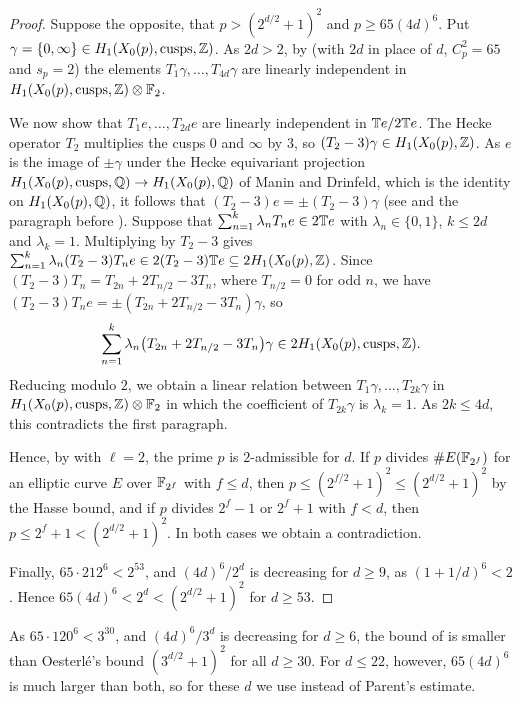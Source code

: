 \begin{proof}
Suppose the opposite, that $p>(2^{d/2}+1)^2$ and $p\geq65(4d)^6$. Put $\gamma=\{0,\infty\}\in H_1(X_0(p),\mathrm{cusps},\mathbb{Z})$. As $2d>2$, by \cite[Proposition 1.9]{parentformal} (with $2d$ in place of $d$, $C_p^2=65$ and $s_p=2$) the elements $T_1\gamma,\dots,T_{4d}\gamma$ are linearly independent in $H_1(X_0(p),\mathrm{cusps},\mathbb{Z})\otimes\mathbb{F}_2$.

We now show that $T_1e,\dots,T_{2d}e$ are linearly independent in $\mathbb{T} e/2\mathbb{T} e$. The Hecke operator $T_2$ multiplies the cusps $0$ and $\infty$ by $3$, so $(T_2-3)\gamma\in H_1(X_0(p),\mathbb{Z})$. As $e$ is the image of $\pm\gamma$ under the Hecke equivariant projection $H_1(X_0(p),\mathrm{cusps},\mathbb{Q})\to H_1(X_0(p),\mathbb{Q})$ of Manin and Drinfeld, which is the identity on $H_1(X_0(p),\mathbb{Q})$, it follows that $(T_2-3)e=\pm(T_2-3)\gamma$ (see \cite[Definition 2.1]{DKSS} and the paragraph before \cite[Corollary 6.4]{DKSS}). Suppose that $\sum_{n=1}^k\lambda_nT_ne\in2\mathbb{T} e$ with $\lambda_n\in\{0,1\}$, $k\leq2d$ and $\lambda_k=1$. Multiplying by $T_2-3$ gives $\sum_{n=1}^k\lambda_n(T_2-3)T_ne\in2(T_2-3)\mathbb{T} e\subseteq2H_1(X_0(p),\mathbb{Z})$. Since $(T_2-3)T_n=T_{2n}+2T_{n/2}-3T_n$, where $T_{n/2}=0$ for odd $n$, we have $(T_2-3)T_ne=\pm(T_{2n}+2T_{n/2}-3T_n)\gamma$, so
$$\sum_{n=1}^k\lambda_n\bigl(T_{2n}+2T_{n/2}-3T_n\bigr)\gamma\in2H_1(X_0(p),\mathrm{cusps},\mathbb{Z}).$$
Reducing modulo $2$, we obtain a linear relation between $T_1\gamma,\dots,T_{2k}\gamma$ in $H_1(X_0(p),\mathrm{cusps},\mathbb{Z})\otimes\mathbb{F}_2$ in which the coefficient of $T_{2k}\gamma$ is $\lambda_k=1$. As $2k\leq4d$, this contradicts the first paragraph.

Hence, by  with $\ell=2$, the prime $p$ is $2$-admissible for $d$. If $p$ divides $\#E(\mathbb{F}_{2^f})$ for an elliptic curve $E$ over $\mathbb{F}_{2^f}$ with $f\leq d$, then $p\leq(2^{f/2}+1)^2\leq(2^{d/2}+1)^2$ by the Hasse bound, and if $p$ divides $2^f-1$ or $2^f+1$ with $f<d$, then $p\leq2^f+1<(2^{d/2}+1)^2$. In both cases we obtain a contradiction.

Finally, $65\cdot212^6<2^{53}$, and $(4d)^6/2^d$ is decreasing for $d\geq9$, as $(1+1/d)^6<2$. Hence $65(4d)^6<2^d<(2^{d/2}+1)^2$ for $d\geq53$.
\end{proof}

As $65\cdot120^6<3^{30}$, and $(4d)^6/3^d$ is decreasing for $d\geq 6$, the bound of  is smaller than Oesterl\'e's bound $(3^{d/2}+1)^2$ for all $d\geq30$. For $d\leq22$, however, $65(4d)^6$ is much larger than both, so for these $d$ we use  instead of Parent's estimate.

